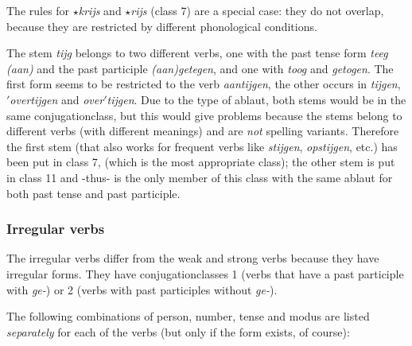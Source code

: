 The rules for {\em $\star$krijs} and {\em $\star$rijs} (class 7) are 
a special case: they do 
not overlap, because they are restricted by different phonological conditions.

The stem {\em tijg} belongs to two different verbs, one with the past tense form
{\em teeg (aan)} and the past participle {\em (aan)getegen}, and one with
{\em toog} and {\em getogen}.
The first form seems to be restricted to the verb 
{\em aantijgen}, the other occurs in {\em tijgen}, $'${\em overtijgen} and
{\em over}$'${\em tijgen}.
Due to the type of ablaut, both stems would be in the same conjugationclass, 
but this would give problems because the stems belong to different verbs 
(with different meanings) and are {\em not} spelling variants. 
Therefore the first stem (that also works for frequent verbs like 
{\em stijgen}, {\em opstijgen}, etc.) has been put in class 7, 
(which is the most appropriate class); the other stem 
is put in class 11 and -thus- is the only member of this class with the 
same ablaut for both past tense and past participle.

\subsubsection{Irregular verbs}

The irregular verbs differ from the weak and strong verbs 
because they have irregular forms. They have conjugationclasses 1 
(verbs that have a past participle with {\em ge-}) or 2 
(verbs with past participles without {\em ge-}).

The following combinations of person, number, tense and modus are listed 
{\em separately}
for each of the verbs (but only if the form exists, of course):

